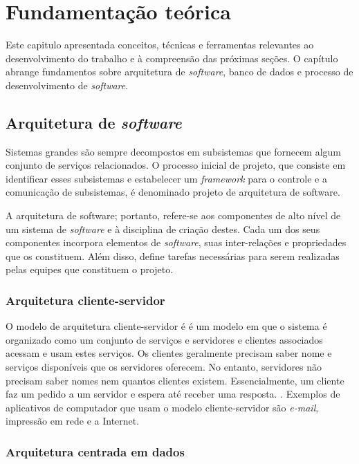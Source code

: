 \chapter{Fundamentação teórica}

Este capitulo apresentada conceitos, técnicas e ferramentas relevantes ao desenvolvimento
do trabalho e à compreensão das próximas seções. O capítulo abrange fundamentos sobre arquitetura de \textit{software}, banco de dados e processo de desenvolvimento de \textit{software}.

\section{Arquitetura de \textit{software}}
\label{fundArquietura}

Sistemas grandes são sempre decompostos em subsistemas que fornecem algum conjunto de serviços relacionados. O processo inicial de projeto, que consiste em identificar esses subsistemas e estabelecer um \textit{framework} para o controle e a comunicação de subsistemas, é denominado projeto de arquitetura de software. \cite{sommerville}

A arquitetura de software; portanto, refere-se aos componentes de alto nível de um sistema de \textit{software} e à disciplina de criação destes. Cada um dos seus componentes incorpora elementos de \textit{software}, suas inter-relações e propriedades que os constituem. Além disso, define tarefas necessárias para serem realizadas pelas equipes que constituem o projeto.


\subsection{Arquitetura cliente-servidor}
\label{arquiteturaCentralizadaDados}

O modelo de arquitetura cliente-servidor é é um modelo em que o sistema é organizado como um conjunto de serviços e servidores e clientes associados acessam e usam estes serviços. Os clientes geralmente precisam saber nome e serviços disponíveis que os servidores oferecem. No entanto, servidores não precisam saber nomes nem quantos clientes existem. Essencialmente, um cliente faz um pedido a um servidor e espera até receber uma resposta. \cite{pressman}. Exemplos de aplicativos de computador que usam o modelo cliente-servidor são \textit{e-mail}, impressão em rede e a Internet.


\subsection{Arquitetura centrada em dados}
\label{arquiteturaCentralizadaDados}

